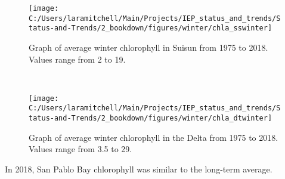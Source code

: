 \documentclass[
]{book}
\begin{document}
\begin{panel-grid}
\begin{columns-nocenter}
\begin{column40}
\end{column40}

\begin{column800}

\begin{expand}

\begin{figure}
\texttt{[image: C:/Users/laramitchell/Main/Projects/IEP\_status\_and\_trends/Status-and-Trends/2\_bookdown/figures/winter/chla\_sswinter]} \caption{Graph of average winter chlorophyll in Suisun from 1975 to 2018. Values range from 2 to 19.}\label{fig:unnamed-chunk-159}
\end{figure}

\end{expand}

\end{column800}

\begin{column40}

~

\end{column40}

\begin{column800}

\begin{expand}

\begin{figure}
\texttt{[image: C:/Users/laramitchell/Main/Projects/IEP\_status\_and\_trends/Status-and-Trends/2\_bookdown/figures/winter/chla\_dtwinter]} \caption{Graph of average winter chlorophyll in the Delta from 1975 to 2018. Values range from 3.5 to 29.}\label{fig:unnamed-chunk-160}
\end{figure}

\end{expand}

\end{column800}

\end{columns-nocenter}

\begin{columns-nocenter}

\begin{column800}

In 2018, San Pablo Bay chlorophyll was similar to the long-term average.

\end{column800}

\begin{column40}

~


\end{column40}
\end{columns-nocenter}
\end{panel-grid}
\end{document}

